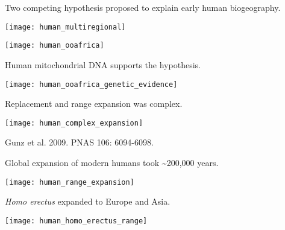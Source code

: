 \documentclass[t]{beamer}
\begin{document}



\begin{frame}[t]{Two competing hypothesis proposed to explain early human biogeography.}
\begin{multicols}{2}
	\texttt{[image: human\_multiregional]}

	\texttt{[image: human\_ooafrica]}
\end{multicols}
\end{frame}

\begin{frame}{Human mitochondrial DNA supports the  hypothesis.}
	\begin{center}
		\texttt{[image: human\_ooafrica\_genetic\_evidence]}
	\end{center}
\end{frame}

\begin{frame}[t]{Replacement and range expansion was complex.}
	\vspace{-\baselineskip}
	\begin{center}
		\texttt{[image: human\_complex\_expansion]}
	\end{center}
\end{frame}

{
\begin{frame}[b]{}

\hfill\tiny Gunz et al. 2009. PNAS 106: 6094-6098.
\end{frame}}

\begin{frame}{Global expansion of modern humans took \textasciitilde{}200,000 years.}
	\vspace{-\baselineskip}
	\begin{center}
		\texttt{[image: human\_range\_expansion]}
	\end{center}
\end{frame}

\begin{frame}{\textit{Homo erectus} expanded to Europe and Asia.}
	\vspace{-\baselineskip}
	\begin{center}
		\texttt{[image: human\_homo\_erectus\_range]}
	\end{center}
\end{frame}
\end{document}
